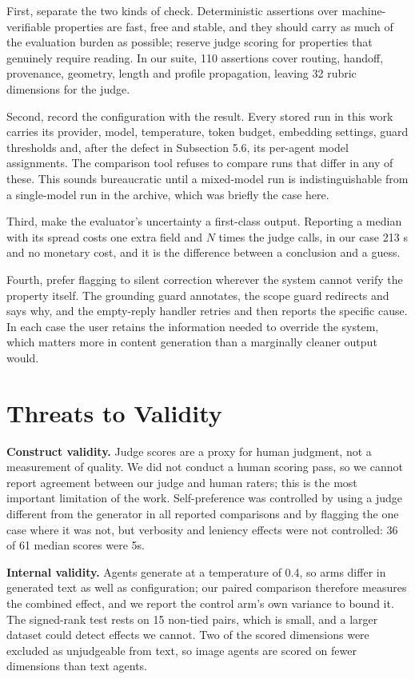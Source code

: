 \documentclass[9pt,twocolumn]{extarticle}
\begin{document}
First, separate the two kinds of check. Deterministic assertions over
machine-verifiable properties are fast, free and stable, and they should carry
as much of the evaluation burden as possible; reserve judge scoring for
properties that genuinely require reading. In our suite, 110 assertions cover
routing, handoff, provenance, geometry, length and profile propagation, leaving
32 rubric dimensions for the judge.

Second, record the configuration with the result. Every stored run in this work
carries its provider, model, temperature, token budget, embedding settings,
guard thresholds and, after the defect in Subsection 5.6, its per-agent model
assignments. The comparison tool refuses to compare runs that differ in any of
these. This sounds bureaucratic until a mixed-model run is indistinguishable
from a single-model run in the archive, which was briefly the case here.

Third, make the evaluator's uncertainty a first-class output. Reporting a
median with its spread costs one extra field and $N$ times the judge calls, in
our case 213 s and no monetary cost, and it is the difference between a
conclusion and a guess.

Fourth, prefer flagging to silent correction wherever the system cannot verify
the property itself. The grounding guard annotates, the scope guard redirects
and says why, and the empty-reply handler retries and then reports the specific
cause. In each case the user retains the information needed to override the
system, which matters more in content generation than a marginally cleaner
output would.

\section{Threats to Validity}

\textbf{Construct validity.} Judge scores are a proxy for human judgment, not
a measurement of quality. We did not conduct a human scoring pass, so we cannot
report agreement between our judge and human raters; this is the most important
limitation of the work. Self-preference was controlled by using a judge
different from the generator in all reported comparisons and by flagging the
one case where it was not, but verbosity and leniency effects were not
controlled: 36 of 61 median scores were 5s.

\textbf{Internal validity.} Agents generate at a temperature of 0.4, so arms
differ in generated text as well as configuration; our paired comparison
therefore measures the combined effect, and we report the control arm's own
variance to bound it. The signed-rank test rests on 15 non-tied pairs, which is
small, and a larger dataset could detect effects we cannot. Two of the scored
dimensions were excluded as unjudgeable from text, so image agents are scored
on fewer dimensions than text agents.
\end{document}
